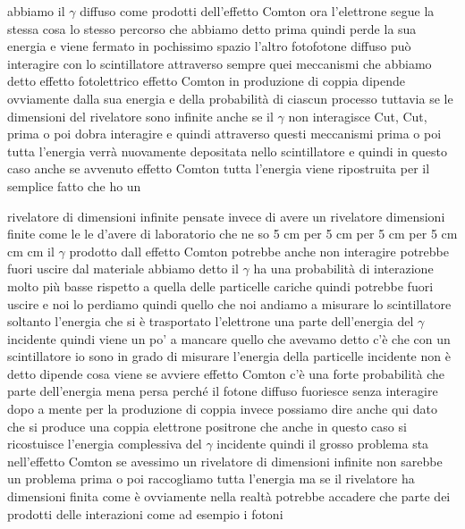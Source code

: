 {abbiamo il $\gamma$ diffuso come prodotti dell'effetto Comton ora l'elettrone segue la stessa cosa lo stesso percorso che abbiamo detto prima quindi perde la sua energia e viene fermato in pochissimo spazio l'altro fotofotone diffuso può interagire con lo scintillatore attraverso sempre quei meccanismi che abbiamo detto effetto fotolettrico effetto Comton in produzione di coppia dipende ovviamente dalla sua energia e della probabilità di ciascun processo tuttavia se le dimensioni del rivelatore sono infinite anche se il $\gamma$ non interagisce Cut, Cut, prima o poi dobra interagire e quindi attraverso questi meccanismi prima o poi tutta l'energia verrà nuovamente depositata nello scintillatore e quindi in questo caso anche se avvenuto effetto Comton tutta l'energia viene ripostruita per il semplice fatto che ho un 

rivelatore di dimensioni infinite pensate invece di avere un rivelatore dimensioni finite come le le d'avere di laboratorio che ne so 5 cm per 5 cm per 5 cm per 5 cm cm cm il $\gamma$ prodotto dall effetto Comton potrebbe anche non interagire potrebbe fuori uscire dal materiale abbiamo detto il $\gamma$ ha una probabilità di interazione molto più basse rispetto a quella delle particelle cariche quindi potrebbe fuori uscire e noi lo perdiamo quindi quello che noi andiamo a misurare lo scintillatore soltanto l'energia che si è trasportato l'elettrone una parte dell'energia del $\gamma$ incidente quindi viene un po' a mancare quello che avevamo detto c'è che con un scintillatore io sono in grado di misurare l'energia della particelle incidente non è detto dipende cosa viene se avviere effetto Comton c'è una forte probabilità che parte dell'energia mena persa perché il fotone diffuso fuoriesce senza interagire dopo a mente per la produzione di coppia invece possiamo dire anche qui dato che si produce una coppia elettrone positrone che anche in questo caso si ricostuisce l'energia complessiva del $\gamma$ incidente quindi il grosso problema sta nell'effetto Comton se avessimo un rivelatore di dimensioni infinite non sarebbe un problema prima o poi raccogliamo tutta l'energia ma se il rivelatore ha dimensioni finita come è ovviamente nella realtà potrebbe accadere che parte dei prodotti delle interazioni come ad esempio i fotoni 

}

